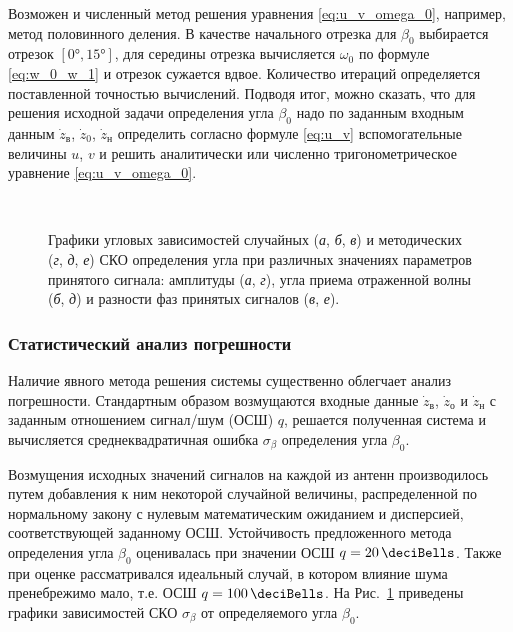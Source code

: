 \documentclass[../main.tex]{subfiles}
\begin{document}
Возможен и численный метод решения уравнения \eqref{eq:u_v_omega_0}, например, метод половинного деления. В качестве начального отрезка для $\beta_0$ выбирается отрезок $[\ang{0}, \ang{15}]$, для середины отрезка вычисляется  $\omega_0$ по формуле \eqref{eq:w_0_w_1} и отрезок сужается вдвое. Количество итераций определяется поставленной точностью вычислений. Подводя итог, можно сказать, что для решения исходной задачи определения угла $\beta_0$ надо по заданным входным данным $\dot{z}_\text{в}$, $\dot{z}_{0}$, $\dot{z}_\text{н}$ определить согласно формуле \eqref{eq:u_v} вспомогательные величины $u$, $v$ и решить аналитически или численно тригонометрическое уравнение \eqref{eq:u_v_omega_0}.

\begin{figure}[htp]
  \centering
  \\

  \caption{Графики угловых зависимостей случайных (\textit{а}, \textit{б}, \textit{в}) и методических (\textit{г}, \textit{д}, \textit{е}) СКО определения угла при различных значениях параметров принятого сигнала: амплитуды (\textit{а}, \textit{г}), угла приема отраженной волны (\textit{б}, \textit{д}) и разности фаз принятых сигналов (\textit{в}, \textit{е}).}
  \label{fig:surface:pic2}
\end{figure}

\subsubsection{Статистический анализ погрешности}

Наличие явного метода решения системы существенно облегчает анализ погрешности. Стандартным образом возмущаются входные данные $\dot{z}_\text{в}$, $\dot{z}_{о}$ и $\dot{z}_\text{н}$ с заданным отношением сигнал/шум (ОСШ) $q$, решается полученная система и вычисляется среднеквадратичная ошибка $\sigma_\beta$ определения угла $\beta_0$.

Возмущения исходных значений сигналов на каждой из антенн производилось путем добавления к ним некоторой случайной величины, распределенной по нормальному закону с нулевым математическим ожиданием и дисперсией, соответствующей заданному ОСШ. Устойчивость предложенного метода определения угла $\beta_0$ оценивалась при значении ОСШ $q = \SI{20}{\deciBells}$. Также при оценке рассматривался идеальный случай, в котором влияние шума пренебрежимо мало, т.е. ОСШ $q = \SI{100}{\deciBells}$. На Рис.~\ref{fig:surface:pic2} приведены графики зависимостей СКО $\sigma_\beta$ от определяемого угла $\beta_0$.
\end{document}
